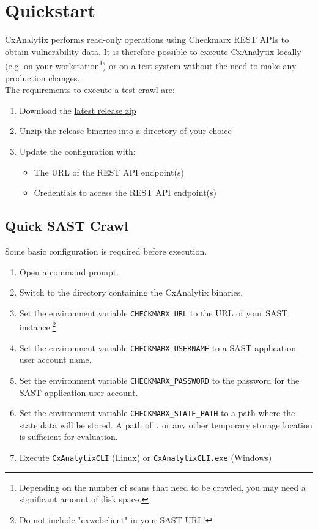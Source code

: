 \chapter{Quickstart}

CxAnalytix performs read-only operations using Checkmarx REST APIs to obtain vulnerability data. It is therefore possible to execute 
CxAnalytix locally (e.g. on your workstation\footnote{Depending on the number of scans that need to be crawled, you may need a significant amount of disk space.}) 
or on a test system without the need to make any production changes.\\

\noindent The requirements to execute a test crawl are:

\begin{enumerate}
    \item Download the \href{https://github.com/checkmarx-ts/CxAnalytix/releases}{latest release zip}
    \item Unzip the release binaries into a directory of your choice
    \item Update the configuration with:
    \begin{itemize}
        \item The URL of the REST API endpoint(s)
        \item Credentials to access the REST API endpoint(s)
    \end{itemize}    
\end{enumerate}


\section{Quick SAST Crawl}


Some basic configuration is required before execution.

\begin{enumerate}
    \item Open a command prompt.
    \item Switch to the directory containing the CxAnalytix binaries.
    \item Set the environment variable \verb|CHECKMARX_URL| to the URL of your SAST instance.\footnote{Do not include "cxwebclient" in your SAST URL!}
    \item Set the environment variable \verb|CHECKMARX_USERNAME| to a SAST application user account name.
    \item Set the environment variable \verb|CHECKMARX_PASSWORD| to the password for the SAST application user account.
    \item Set the environment variable \verb|CHECKMARX_STATE_PATH| to a path where the state data will be stored.  
    A path of \verb|.| or any other temporary storage location is sufficient for evaluation.
    \item Execute \verb|CxAnalytixCLI| (Linux) or \verb|CxAnalytixCLI.exe| (Windows)
\end{enumerate}

